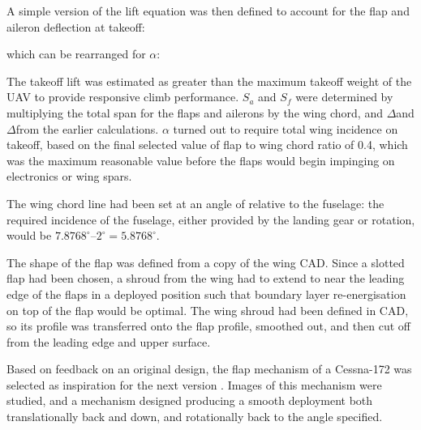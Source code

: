 \documentclass[../../main.tex]{subfiles}
\begin{document}
A simple version of the lift equation was then defined to account for the flap and aileron deflection at takeoff: 


which can be rearranged for $\alpha$:


The takeoff lift was estimated as  greater than the maximum takeoff weight of the UAV to provide responsive climb performance.
$S_a$ and $S_f$ were determined by multiplying the total span for the flaps and ailerons by the wing chord, and $\Delta$\cla and $\Delta$\clf from the earlier calculations.
$\alpha$ turned out to require  total wing incidence on takeoff, based on the final selected value of flap to wing chord ratio of 0.4, which was the maximum reasonable value before the flaps would begin impinging on electronics or wing spars.

The wing chord line had been set at an angle of  relative to the fuselage: the required incidence of the fuselage, either provided by the landing gear or rotation, would be $7.8768^\circ – 2^\circ = 5.8768^\circ$. 

The shape of the flap was defined from a copy of the wing CAD.
Since a slotted flap had been chosen, a shroud from the wing had to extend to near the leading edge of the flaps in a deployed position such that boundary layer re-energisation on top of the flap would be optimal.
The wing shroud had been defined in CAD, so its profile was transferred onto the flap profile, smoothed out, and then cut off from the leading edge and upper surface.  

Based on feedback on an original design, the flap mechanism of a Cessna-172 was selected as inspiration for the next version \cite{towell-19}.
Images of this mechanism were studied, and a mechanism designed producing a smooth deployment both translationally back and down, and rotationally back to the  angle specified. 
\end{document}

